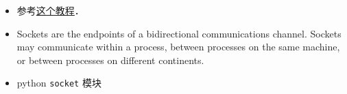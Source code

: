 
\begin{itemize}
\item 参考\href{https://www.tutorialspoint.com/python/python_networking.htm}{这个教程}．
\item Sockets are the endpoints of a bidirectional communications channel. Sockets may communicate within a process, between processes on the same machine, or between processes on different continents.
\item python \verb|socket| 模块
\end{itemize}
